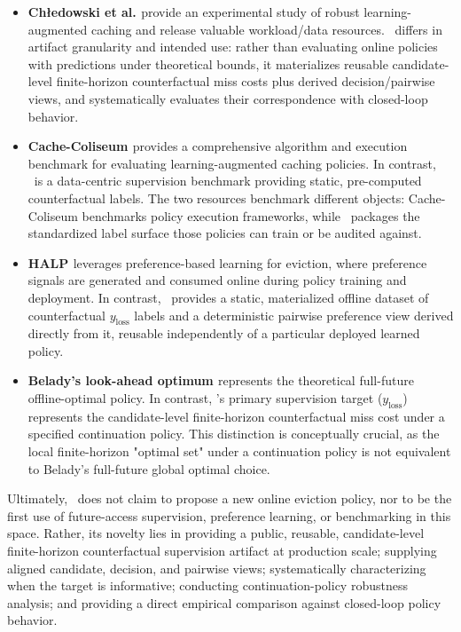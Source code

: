 \begin{itemize}[leftmargin=*]
  \item \textbf{Ch\l{}edowski et al. \cite{chledowski2021robustlac}} provide an experimental study of robust learning-augmented caching and release valuable workload/data resources. \lafc\ differs in artifact granularity and intended use: rather than evaluating online policies with predictions under theoretical bounds, it materializes reusable candidate-level finite-horizon counterfactual miss costs plus derived decision/pairwise views, and systematically evaluates their correspondence with closed-loop behavior.
  \item \textbf{Cache-Coliseum \cite{cachecoliseumrepo}} provides a comprehensive algorithm and execution benchmark for evaluating learning-augmented caching policies. In contrast, \lafc\ is a data-centric supervision benchmark providing static, pre-computed counterfactual labels. The two resources benchmark different objects: Cache-Coliseum benchmarks policy execution frameworks, while \lafc\ packages the standardized label surface those policies can train or be audited against.
  \item \textbf{HALP \cite{song2023halp}} leverages preference-based learning for eviction, where preference signals are generated and consumed online during policy training and deployment. In contrast, \lafc\ provides a static, materialized offline dataset of counterfactual $y_{\text{loss}}$ labels and a deterministic pairwise preference view derived directly from it, reusable independently of a particular deployed learned policy.
  \item \textbf{Belady's look-ahead optimum \cite{belady1966study}} represents the theoretical full-future offline-optimal policy. In contrast, \lafc's primary supervision target ($y_{\text{loss}}$) represents the candidate-level finite-horizon counterfactual miss cost under a specified continuation policy. This distinction is conceptually crucial, as the local finite-horizon "optimal set" under a continuation policy is not equivalent to Belady's full-future global optimal choice.
\end{itemize}

Ultimately, \lafc\ does not claim to propose a new online eviction policy, nor to be the first use of future-access supervision, preference learning, or benchmarking in this space. Rather, its novelty lies in providing a public, reusable, candidate-level finite-horizon counterfactual supervision artifact at production scale; supplying aligned candidate, decision, and pairwise views; systematically characterizing when the target is informative; conducting continuation-policy robustness analysis; and providing a direct empirical comparison against closed-loop policy behavior.

\endgroup
